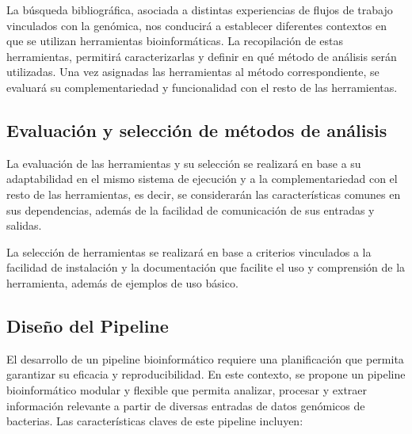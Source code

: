 \documentclass[12pt]{article}
\begin{document}
La búsqueda bibliográfica, asociada a distintas experiencias 
de flujos de trabajo vinculados con la genómica, nos conducirá 
a establecer diferentes contextos en que se utilizan herramientas 
bioinformáticas. La recopilación de estas herramientas, permitirá  
caracterizarlas y definir en qué método de análisis serán utilizadas.
Una vez asignadas las herramientas al método correspondiente, 
se evaluará su complementariedad y funcionalidad con el resto 
de las herramientas.

\subsection*{Evaluación y selección de métodos de análisis}

La evaluación de las herramientas y su selección se realizará 
en base a su adaptabilidad en el mismo sistema de ejecución y 
a la complementariedad con el resto de las herramientas, es 
decir, se considerarán las características comunes en sus 
dependencias, además de  la facilidad de comunicación de sus 
entradas y salidas.

La selección  de herramientas se realizará en base a 
criterios vinculados a la facilidad de instalación y la 
documentación que facilite el uso y comprensión  de la 
herramienta, además de ejemplos de uso básico.

\subsection*{Diseño del Pipeline}

El desarrollo de un pipeline bioinformático requiere 
una planificación que permita garantizar su eficacia y
reproducibilidad. En este contexto, se propone un 
pipeline bioinformático modular y flexible que permita 
analizar, procesar y extraer información relevante a partir 
de diversas entradas de datos genómicos de bacterias. Las 
características claves de este pipeline incluyen:
\end{document}
